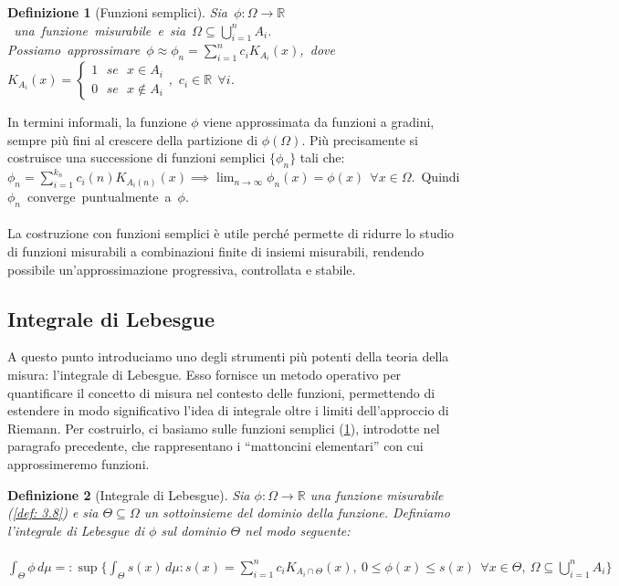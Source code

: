 \documentclass[a4paper,12pt]{report}
\newtheorem{definizione}{Definizione}[chapter]
\begin{document}
\begin{definizione}[Funzioni semplici]\label{def: 3.10}
    \mbox{Sia $\phi: \Omega \to \mathbb{R}$ una funzione misurabile e sia $\Omega \subseteq \displaystyle\bigcup_{i=1}^nA_i$.}
    \\ \mbox{Possiamo approssimare $\phi\approx\phi_n=\displaystyle\sum_{i=1}^nc_iK_{A_i}(x)$, dove $K_{A_i}(x)=\begin{cases}
        1    \ \ \ se  \ \ \ x \in A_i
        \\ 0 \ \ \ se \ \ \ x \not\in A_i
    \end{cases}$, $c_i \in \mathbb{R} \ \ \forall i$.}
\end{definizione}

In termini informali, la funzione $\phi$ viene approssimata da funzioni a gradini, sempre più fini al crescere della partizione di $\phi(\Omega)$.
Più precisamente si costruisce una successione di funzioni semplici $\{\phi_n\}$ tali che:
\\\mbox{$\phi_n=\displaystyle\sum_{i=1}^{k_n}c_i(n) K_{A_i(n)}(x) \implies \lim_{n\to\infty}\phi_n(x)=\phi(x) \ \ \forall x \in \Omega$. Quindi $\phi_n$ converge puntualmente a $\phi$.}
\\
\\La costruzione con funzioni semplici è utile perché permette di ridurre lo studio di funzioni misurabili a combinazioni finite di insiemi misurabili, rendendo possibile un'approssimazione progressiva, controllata e stabile.

\newpage

\subsection{Integrale di Lebesgue}

A questo punto introduciamo uno degli strumenti più potenti della teoria della misura: l’integrale di Lebesgue. Esso fornisce un metodo operativo per quantificare il concetto di misura nel contesto delle funzioni, permettendo di estendere in modo significativo l’idea di integrale oltre i limiti dell’approccio di Riemann. Per costruirlo, ci basiamo sulle funzioni semplici (\ref{def: 3.10}), introdotte nel paragrafo precedente, che rappresentano i “mattoncini elementari” con cui approssimeremo funzioni.

\begin{definizione}[Integrale di Lebesgue]
    Sia $\phi: \Omega \to \mathbb{R}$ una funzione misurabile (\ref{def: 3.8}) e sia $\Theta \subseteq \Omega$ un sottoinsieme del dominio della funzione. Definiamo l'integrale di Lebesgue di $\phi$ sul dominio $\Theta$ nel modo seguente:
    \\
    \\ \mbox{$\displaystyle\int_\Theta \phi\,d\mu=:\sup\bigg\{\int_\Theta s(x)\,d\mu: s(x)=\sum_{i=1}^nc_iK_{A_i \cap \Theta }(x), \  0 \leq \phi(x)\leq s(x) \ \ \forall x \in \Theta, \ \Omega \subseteq \bigcup_{i=1}^nA_i \bigg\}$}
\end{definizione}
\end{document}
